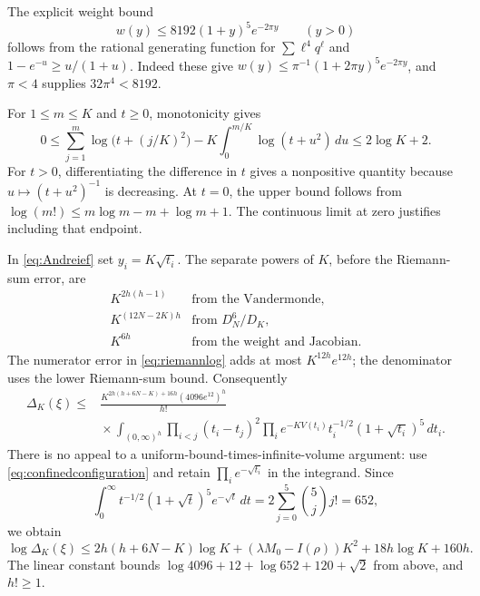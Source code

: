 The explicit weight bound
\begin{equation}\label{eq:weightupper}
 w(y)\le8192(1+y)^5e^{-2\pi y}\qquad(y>0)
\end{equation}
follows from the rational generating function for $\sum\ell^4q^\ell$
and $1-e^{-u}\ge u/(1+u)$. Indeed these give
$w(y)\le\pi^{-1}(1+2\pi y)^5e^{-2\pi y}$, and $\pi<4$ supplies
$32\pi^4<8192$.

For $1\le m\le K$ and $t\ge0$, monotonicity gives
\begin{equation}\label{eq:riemannlog}
 0\le\sum_{j=1}^m\log\bigl(t+(j/K)^2\bigr)
    -K\int_0^{m/K}\log(t+u^2)\,du\le2\log K+2.
\end{equation}
For $t>0$, differentiating the difference in $t$ gives a nonpositive
quantity because $u\mapsto(t+u^2)^{-1}$ is decreasing. At $t=0$, the
upper bound follows from
$\log(m!)\le m\log m-m+\log m+1$. The continuous limit at zero
justifies including that endpoint.

In \eqref{eq:Andreief} set $y_i=K\sqrt{t_i}$. The separate powers of
$K$, before the Riemann-sum error, are
\[
\begin{array}{rl}
 K^{2h(h-1)}&\text{from the Vandermonde},\\
 K^{(12N-2K)h}&\text{from }D_N^6/D_K,\\
 K^{6h}&\text{from the weight and Jacobian}.
\end{array}
\]
The numerator error in \eqref{eq:riemannlog} adds at most
$K^{12h}e^{12h}$; the denominator uses the lower Riemann-sum bound.
Consequently
\begin{equation}\label{eq:scaledgram}
\begin{split}
 \Delta_K(\xi)\le{}&
 \frac{K^{2h(h+6N-K)+16h}(4096e^{12})^h}{h!}\\
 &\mathrel{}\times\int_{(0,\infty)^h}\prod_{i<j}(t_i-t_j)^2
       \prod_i e^{-KV(t_i)}t_i^{-1/2}(1+\sqrt{t_i})^5\,dt_i.
\end{split}
\end{equation}
There is no appeal to a uniform-bound-times-infinite-volume argument:
use \eqref{eq:confinedconfiguration} and retain
$\prod_i e^{-\sqrt{t_i}}$ in the integrand. Since
\[
 \int_0^\infty t^{-1/2}(1+\sqrt t)^5e^{-\sqrt t}\,dt
 =2\sum_{j=0}^5\binom5j j!=652,
\]
we obtain
\begin{equation}\label{eq:logdelta}
 \log\Delta_K(\xi)
 \le2h(h+6N-K)\log K+(\lambda M_0-I(\rho))K^2
                         +18h\log K+160h.
\end{equation}
The linear constant bounds
$\log4096+12+\log652+120+\sqrt2$ from above, and $h!\ge1$.

